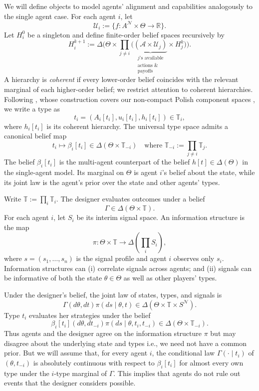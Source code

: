 \documentclass[12pt,reqno]{article}
\theoremstyle{definition} \newtheorem{example}{Example}
\theoremstyle{definition} \newtheorem{condition}{Condition}
\theoremstyle{definition} \newtheorem{corollary}{Corollary}
\theoremstyle{definition} \newtheorem{claim}{Claim}
\theoremstyle{definition} \newtheorem{definition}{Definition}
\theoremstyle{definition} \newtheorem{conjecture}{Conjecture}
\theoremstyle{definition} \newtheorem{Lemma}{Lemma}
\theoremstyle{definition} \newtheorem{lemma}{Lemma}
\theoremstyle{plain} \newtheorem{theorem}{Theorem}
\theoremstyle{definition} \newtheorem{assumption}{Assumption}
\theoremstyle{definition} \newtheorem*{assumptionnonumber}{Assumption}
\theoremstyle{definition} \newtheorem*{theoremNoNumber}{Proposition}
\theoremstyle{definition}\newtheorem{proposition}{Proposition}
\theoremstyle{definition} \newtheorem{observation}{Observation}
\theoremstyle{definition} \newtheorem*{definitionNoNumber}{Definition}
\theoremstyle{definition} \newtheorem{Definition}{Definition}
\theoremstyle{definition} \newtheorem*{DefinitionNoNumber}{Definition}
\theoremstyle{definition} \newtheorem*{fact}{Fact}
\theoremstyle{definition} \newtheorem*{property}{Property}
\theoremstyle{definition} \newtheorem{remark}{Remark}
\theoremstyle{definition}\newtheorem{romanexampleinner}{Example}
\begin{document}
We will define objects to model agents' alignment and capabilities analogously to the single agent case. For each agent $i$, let
\[
\mathcal U_i:=\{f:A^{\mathcal N}\times\Theta\to\mathbb R\}.
\]
Let $H_i^0$ be a singleton and define finite-order belief spaces recursively by
\[
H_i^{k+1}
:=
\Delta\bigg(
\Theta\times\prod_{j\neq i}
\big(\underbrace{(\mathscr A\times\mathcal U_j)}_{\substack{\text{$j$'s available} \\  \text{actions \&} \\  \text{payoffs}}}
\times H_j^k\big)
\bigg).
\]
A hierarchy is \emph{coherent} if every lower-order belief coincides with the relevant marginal of each higher-order belief; we restrict attention to coherent hierarchies. Following \citet{brandenburger1993hierarchies}, whose construction covers our non-compact Polish component spaces \citep[cf.][]{mertens1985formulation}, we write a type as
\[
t_i=(A_i[t_i],u_i[t_i],h_i[t_i])\in\mathbb T_i,
\]
where $h_i[t_i]$ is its coherent hierarchy.
The universal type space admits a canonical belief map
\[
t_i\longmapsto\beta_i[t_i]
\in\Delta(\Theta\times\mathbb T_{-i}) \quad \text{where }
\mathbb T_{-i}:=\prod_{j\neq i}\mathbb T_j.
\]
The belief $\beta_i[t_i]$ is the multi-agent counterpart of the belief $h[t] \in \Delta(\Theta)$ in the single-agent model. Its marginal on $\Theta$ is agent $i$'s belief about the state, while its joint law is the agent's prior over the state and other agents' types. 

Write $\mathbb T:=\prod_i\mathbb T_i$. The designer evaluates outcomes under a belief
\[
\Gamma\in\Delta(\Theta\times\mathbb T).
\]
For each agent $i$, let $S_i$ be its interim signal space. An information structure is the map 
\[
\pi:\Theta\times\mathbb T
\longrightarrow
\Delta\left(\prod_i S_i\right),
\]
where $s=(s_1,\ldots,s_n)$ is the signal profile and agent $i$ observes only $s_i$. Information structures  can (i) correlate signals across agents; and (ii) signals can be informative of both the state $\theta \in \Theta$ as well as other players' types. 

Under the designer's belief, the joint law of states, types, and signals is
\[
\Gamma(d\theta,dt)\pi(ds\mid\theta,t) \in \Delta(\Theta \times \mathbb{T} \times S^{\mathcal{N}}). 
\]
Type $t_i$ evaluates her strategies under the belief 
\[
\beta_i[t_i](d\theta,dt_{-i})
\pi(ds\mid\theta,t_i,t_{-i}) \in \Delta(\Theta \times \mathbb{T}_{-i}).
\]
Thus agents and the designer agree on the information structure $\pi$ but may disagree about the underlying state and types i.e., we need not have a common prior. But we will assume that, for every agent $i$, the conditional law $\Gamma(\cdot\mid t_i)$ of $(\theta,t_{-i})$ is absolutely continuous with respect to $\beta_i[t_i]$ for almost every own type under the $i$-type marginal of $\Gamma$. This implies that agents do not rule out events that the designer considers possible.
\end{document}
